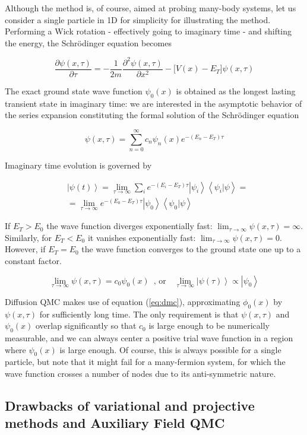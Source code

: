 Although the method is, of course, aimed at probing many-body systems, let us consider a single particle in \acl{1D} for simplicity for illustrating the method.
Performing a Wick rotation - effectively going to imaginary time - and shifting the energy, the Schr\"odinger equation becomes

\begin{equation}
\frac{\partial \psi ( x, \tau )}{\partial\tau}  = -\frac{1}{2m}\frac{\partial^2 \psi ( x, \tau )}{\partial x^2} - \bigg[ V(x) - E_T \bigg] \psi( x, \tau ) 
\end{equation}

The exact ground state wave function $\psi_0 ( x )$ is obtained as the longest lasting transient state in imaginary time: we are interested in the asymptotic behavior of the series expansion constituting the formal solution of the Schr\"odinger equation

\begin{equation}
\psi (x, \tau) = \sum_{n=0}^{\infty} c_n \psi_n (x) e^{-(E_n - E_T)\tau}
\end{equation}

Imaginary time evolution is governed by

\begin{equation}\label{eq:im_ev}
\begin{split}
&\left| \psi (t) \right\rangle = \lim_{\tau \rightarrow \infty} \sum_i e^{-(E_i - E_T) \tau} \left|\psi_i \right\rangle \left\langle \psi_i | \psi \right\rangle = \\
&= \lim_{\tau \rightarrow \infty} e^{-(E_0 - E_T)\tau} \left| \psi_0 \right\rangle \left\langle \psi_0 | \psi \right\rangle 
\end{split}
\end{equation}


If $E_T > E_0$ the wave function diverges exponentially fast: $\lim_{\tau \rightarrow \infty} \psi ( x, \tau) = \infty$.
Similarly, for $E_T < E_0$ it vanishes exponentially fast: $\lim_{\tau \rightarrow \infty} \psi ( x, \tau) = 0$.
However, if $E_T = E_0$ the wave function converges to the ground state one up to a constant factor.

\begin{equation}\label{eq:dmc}
\lim_{\tau \rightarrow \infty} \psi ( x, \tau) = c_0 \psi_0 (x) \,\,\, \text{, or} \quad \lim_{\tau \rightarrow \infty} \left|\psi (\tau) \right\rangle \propto \left| \psi_0 \right\rangle
\end{equation}

Diffusion \ac{QMC} makes use of equation (\ref{eq:dmc}), approximating $\phi_0(x)$ by $\psi (x, \tau)$ for sufficiently long time.
The only requirement is that $\psi (x, \tau)$ and $\psi_0(x)$ overlap significantly so that $c_0$ is large enough to be numerically measurable, and we can always center a positive trial wave function in a region where $\psi_0(x)$ is large enough.
Of course, this is always possible for a single particle, but note that it might fail for a many-fermion system, for which the wave function crosses a number of nodes due to its anti-symmetric nature.

\subsection{Drawbacks of variational and projective methods and  Auxiliary Field \acs{QMC}}
\label{subsec:introAFQMC}